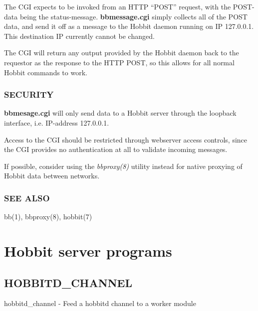   The CGI expects to be invoked from an HTTP ``POST'' request, with
  the POST-data being the status-message. \textbf{bbmessage.cgi}
  simply collects all of the POST data, and send it off as a message
  to the Hobbit daemon running on IP 127.0.0.1. This destination IP
  currently cannot be changed. 



  The CGI will return any output provided by the Hobbit daemon back to
  the requestor as the response to the HTTP POST, so this allows for
  all normal Hobbit commands to work. 



 
\subsection{SECURITY}
\textbf{bbmesage.cgi} will only send data to a Hobbit server through
the loopback interface, i.e. IP-address 127.0.0.1. 


  Access to the CGI should be restricted through webserver access
  controls, since the CGI provides no authentication at all to
  validate incoming messages. 



  If possible, consider using the \emph{bbproxy(8)}
 utility instead for native proxying of Hobbit data between networks. 


 
\subsection{SEE ALSO}
bb(1), bbproxy(8), hobbit(7) 


%
\chapter{Hobbit server programs}

%

\section{HOBBITD\_CHANNEL}

 hobbitd\_channel - Feed a hobbitd channel to a worker module 

